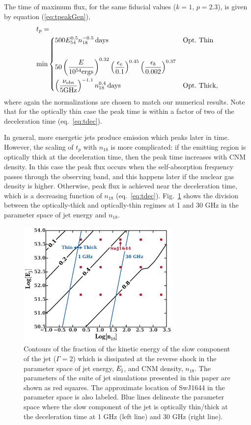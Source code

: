 \documentclass[usenatbib,fleqn]{mnras}
\begin{document}
The time of maximum flux, for the same fiducial values ($k = 1$,
$p=2.3$), is given by equation (\ref{eq:tpeakGen}),
\begin{align}
&t_p =\nonumber\\ &\text{min}
\begin{dcases}
  500 E_{54}^{0.5} n_{18}^{-0.5} \,{\rm days} & {\rm Opt.~Thin}\\\\
  50 \left(\frac{E}{10^{54} {\rm ergs}}\right)^{0.32}
  \left(\frac{\epsilon_e}{0.1}\right)^{0.45}
  \left(\frac{\epsilon_b}{0.002}\right)^{0.37}\\
  \left(\frac{\nu_{\rm obs}}{5 {\rm GHz}}\right)^{-1.1} n_{18}^{0.4}
  \,{\rm days}& {\rm Opt.~Thick},
\end{dcases}
\label{eq:peakTime}
\end{align}
where again the normalizations are chosen to match our numerical
results. Note that for the optically thin case the peak time
is within a factor of two of the deceleration time
(eq.~\ref{eq:tdec}).

In general, more energetic jets produce emission which peaks later in
time.  However, the scaling of $t_p$ with $n_{18}$ is more
complicated: if the emitting region is optically thick at the
deceleration time, then the peak time increases with CNM density. In
this case the peak flux occurs when the self-absorption frequency
passes through the observing band, and this happens later if the
nuclear gas density is higher. Otherwise, peak flux is achieved near
the deceleration time, which is a decreasing function of $n_{18}$
(eq.~\ref{eq:tdec}).  Fig.~\ref{fig:diss} shows the division between
the optically-thick and optically-thin regimes at 1 and 30 GHz in the
parameter space of jet energy and $n_{18}$.

\begin{figure}
\includegraphics[width=8cm]{diss.pdf}
\caption{\label{fig:diss} Contours of the fraction of the kinetic
  energy of the slow component of the jet ($\Gamma=2$) which is
  dissipated at the reverse shock in the parameter space of jet
  energy, $E_{\rm j}$, and CNM density, $n_{18}$.  The parameters of
  the suite of jet simulations presented in this paper are shown as
  red squares. The approximate location of SwJ1644 in the parameter
  space is also labeled.  Blue lines delineate the parameter space
  where the slow component of the jet is optically thin/thick at the
  deceleration time at 1 GHz (left line) and 30 GHz (right line).}
\end{figure}
\end{document}

